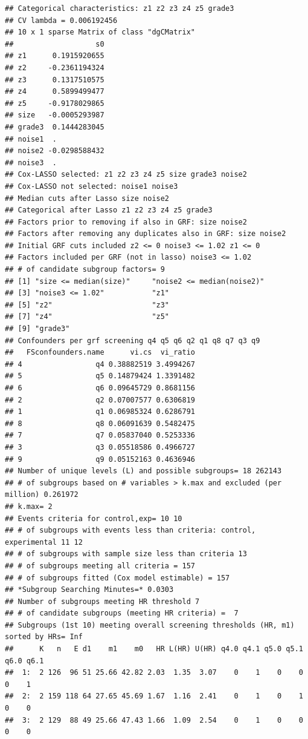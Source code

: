 \documentclass[smallextended]{svjour3}
\makeatletter
\newenvironment{kframe}{%
 \def\at@end@of@kframe{}%
 \ifinner\ifhmode%
  \def\at@end@of@kframe{\end{minipage}}%
  \begin{minipage}{\columnwidth}%
 \fi\fi%
 \def\FrameCommand##1{\hskip\@totalleftmargin \hskip-\fboxsep
 \colorbox{shadecolor}{##1}\hskip-\fboxsep
     \hskip-\linewidth \hskip-\@totalleftmargin \hskip\columnwidth}%
 \MakeFramed {\advance\hsize-\width
   \@totalleftmargin\z@ \linewidth\hsize
   \@setminipage}}%
 {\par\unskip\endMakeFramed%
 \at@end@of@kframe}
\newenvironment{knitrout}{}{} %
\makeatother
\begin{document}
\begin{knitrout}
\begin{kframe}
\begin{verbatim}
## Categorical characteristics: z1 z2 z3 z4 z5 grade3 
## CV lambda = 0.006192456 
## 10 x 1 sparse Matrix of class "dgCMatrix"
##                   s0
## z1      0.1915920655
## z2     -0.2361194324
## z3      0.1317510575
## z4      0.5899499477
## z5     -0.9178029865
## size   -0.0005293987
## grade3  0.1444283045
## noise1  .           
## noise2 -0.0298588432
## noise3  .           
## Cox-LASSO selected: z1 z2 z3 z4 z5 size grade3 noise2 
## Cox-LASSO not selected: noise1 noise3 
## Median cuts after Lasso size noise2 
## Categorical after Lasso z1 z2 z3 z4 z5 grade3 
## Factors prior to removing if also in GRF: size noise2 
## Factors after removing any duplicates also in GRF: size noise2 
## Initial GRF cuts included z2 <= 0 noise3 <= 1.02 z1 <= 0 
## Factors included per GRF (not in lasso) noise3 <= 1.02 
## # of candidate subgroup factors= 9 
## [1] "size <= median(size)"     "noise2 <= median(noise2)"
## [3] "noise3 <= 1.02"           "z1"                      
## [5] "z2"                       "z3"                      
## [7] "z4"                       "z5"                      
## [9] "grade3"                  
## Confounders per grf screening q4 q5 q6 q2 q1 q8 q7 q3 q9 
##   FSconfounders.name      vi.cs  vi_ratio
## 4                 q4 0.38882519 3.4994267
## 5                 q5 0.14879424 1.3391482
## 6                 q6 0.09645729 0.8681156
## 2                 q2 0.07007577 0.6306819
## 1                 q1 0.06985324 0.6286791
## 8                 q8 0.06091639 0.5482475
## 7                 q7 0.05837040 0.5253336
## 3                 q3 0.05518586 0.4966727
## 9                 q9 0.05152163 0.4636946
## Number of unique levels (L) and possible subgroups= 18 262143 
## # of subgroups based on # variables > k.max and excluded (per million) 0.261972 
## k.max= 2 
## Events criteria for control,exp= 10 10 
## # of subgroups with events less than criteria: control, experimental 11 12 
## # of subgroups with sample size less than criteria 13 
## # of subgroups meeting all criteria = 157 
## # of subgroups fitted (Cox model estimable) = 157 
## *Subgroup Searching Minutes=* 0.0303 
## Number of subgroups meeting HR threshold 7 
## # of candidate subgroups (meeting HR criteria) =  7 
## Subgroups (1st 10) meeting overall screening thresholds (HR, m1) sorted by HRs= Inf 
##      K   n   E d1    m1    m0   HR L(HR) U(HR) q4.0 q4.1 q5.0 q5.1 q6.0 q6.1
##  1:  2 126  96 51 25.66 42.82 2.03  1.35  3.07    0    1    0    0    0    1
##  2:  2 159 118 64 27.65 45.69 1.67  1.16  2.41    0    1    0    1    0    0
##  3:  2 129  88 49 25.66 47.43 1.66  1.09  2.54    0    1    0    0    0    0

\end{verbatim}
\end{kframe}
\end{knitrout}
\end{document}
